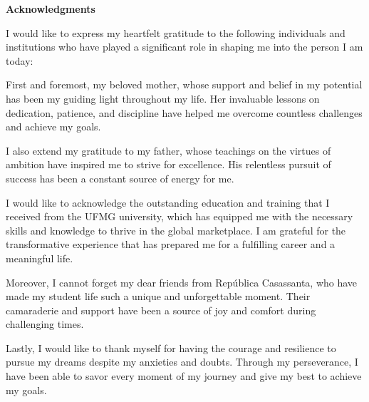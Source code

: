 
\begin{center}
\huge{{\bf Acknowledgments}}
\vspace{4cm}
\end{center}

I would like to express my heartfelt gratitude to the following individuals and institutions who have played a significant role in shaping me into the person I am today:

First and foremost, my beloved mother, whose support and belief in my potential has been my guiding light throughout my life. Her invaluable lessons on dedication, patience, and discipline have helped me overcome countless challenges and achieve my goals.

I also extend my gratitude to my father, whose teachings on the virtues of ambition have inspired me to strive for excellence. His relentless pursuit of success has been a constant source of energy for me.

I would like to acknowledge the outstanding education and training that I received from the UFMG university, which has equipped me with the necessary skills and knowledge to thrive in the global marketplace. I am grateful for the transformative experience that has prepared me for a fulfilling career and a meaningful life.

Moreover, I cannot forget my dear friends from República Casassanta, who have made my student life such a unique and unforgettable moment. Their camaraderie and support have been a source of joy and comfort during challenging times.

Lastly, I would like to thank myself for having the courage and resilience to pursue my dreams despite my anxieties and doubts. Through my perseverance, I have been able to savor every moment of my journey and give my best to achieve my goals.


\clearpage
\thispagestyle{empty}
\cleardoublepage
